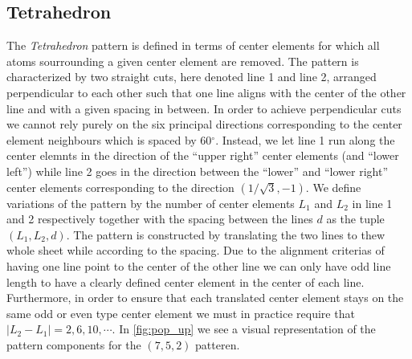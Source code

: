 \subsection{Tetrahedron}
The \textit{Tetrahedron} pattern is defined in terms of center elements for which all
atoms sourrounding a given center element are removed. The pattern is
characterized by two straight cuts, here denoted line 1 and line 2, arranged
perpendicular to each other such that one line aligns with the center of the
other line and with a given spacing in between. In order to achieve
perpendicular cuts we cannot rely purely on the six principal directions
corresponding to the center element neighbours which is spaced by 60$^\circ$.
Instead, we let line 1 run along the center elemnts in the direction of the
``upper right'' center elements (and ``lower left'') while line 2 goes in the
direction between the ``lower'' and ``lower right'' center elements
corresponding to the direction $(1/\sqrt{3}, -1)$. We define variations of the
pattern by the number of center elements $L_1$ and $L_2$ in line 1 and 2
respectively together with the spacing between the lines $d$ as the tuple $(L_1,
L_2, d)$. The pattern is constructed by translating the two lines to thew whole sheet while according to the spacing. Due to the alignment criterias of having one line point to the center of the other line we can only have odd line length to have a clearly defined center element in the center of each line. Furthermore, in order to ensure that each translated center element stays on the same odd or even type center element we must in practice require that $|L_2 - L_1| = 2, 6, 10, \cdots$. In \cref{fig:pop_up} we see a visual representation of the pattern components for the $(7, 5, 2)$ patteren. 


